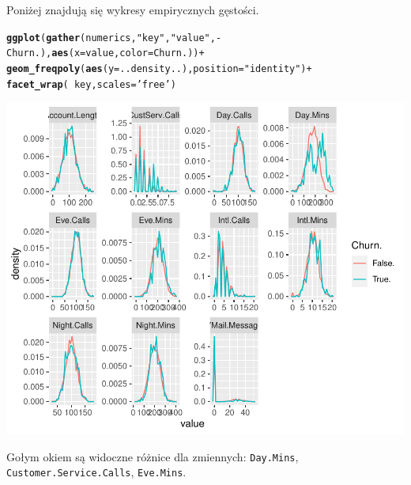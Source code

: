 \documentclass{article}\usepackage[]{graphicx}\usepackage[]{color}
\makeatletter
\def\maxwidth{ %
  \ifdim\Gin@nat@width>\linewidth
    \linewidth
  \else
    \Gin@nat@width
  \fi
}
\newcommand{\hlstr}[1]{\textcolor[rgb]{0.192,0.494,0.8}{#1}}%
\newcommand{\hlopt}[1]{\textcolor[rgb]{0,0,0}{#1}}%
\newcommand{\hlstd}[1]{\textcolor[rgb]{0.345,0.345,0.345}{#1}}%
\newcommand{\hlkwc}[1]{\textcolor[rgb]{0.333,0.667,0.333}{#1}}%
\newcommand{\hlkwd}[1]{\textcolor[rgb]{0.737,0.353,0.396}{\textbf{#1}}}%
\newenvironment{kframe}{%
 \def\at@end@of@kframe{}%
 \ifinner\ifhmode%
  \def\at@end@of@kframe{\end{minipage}}%
  \begin{minipage}{\columnwidth}%
 \fi\fi%
 \def\FrameCommand##1{\hskip\@totalleftmargin \hskip-\fboxsep
 \colorbox{shadecolor}{##1}\hskip-\fboxsep
     \hskip-\linewidth \hskip-\@totalleftmargin \hskip\columnwidth}%
 \MakeFramed {\advance\hsize-\width
   \@totalleftmargin\z@ \linewidth\hsize
   \@setminipage}}%
 {\par\unskip\endMakeFramed%
 \at@end@of@kframe}
\newenvironment{knitrout}{}{} %
\makeatother
\begin{document}
Poniżej znajdują się wykresy empirycznych gęstości.
\begin{knitrout}
\color{fgcolor}\begin{kframe}
\begin{alltt}
\hlkwd{ggplot}\hlstd{(}\hlkwd{gather}\hlstd{(numerics,} \hlstr{"key"}\hlstd{,} \hlstr{"value"}\hlstd{,} \hlopt{-}\hlstd{Churn.),} \hlkwd{aes}\hlstd{(}\hlkwc{x}\hlstd{=value,} \hlkwc{color}\hlstd{=Churn.))} \hlopt{+}
  \hlkwd{geom_freqpoly}\hlstd{(}\hlkwd{aes}\hlstd{(}\hlkwc{y}\hlstd{=..density..),} \hlkwc{position}\hlstd{=}\hlstr{"identity"}\hlstd{)} \hlopt{+}
  \hlkwd{facet_wrap}\hlstd{(}\hlopt{~}\hlstd{key,} \hlkwc{scales}\hlstd{=}\hlstr{'free'}\hlstd{)}
\end{alltt}
\end{kframe}

{\centering \includegraphics[width=\maxwidth]{figure/Wykresy_gestosci-1} 

}



\end{knitrout}
Gołym okiem są widoczne różnice dla zmiennych: \verb|Day.Mins|, \verb|Customer.Service.Calls|, \verb|Eve.Mins|.
\end{document}
